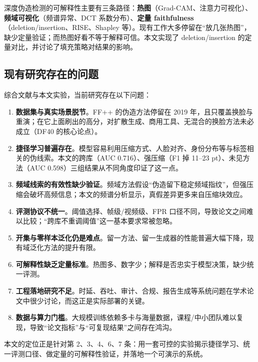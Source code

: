 深度伪造检测的可解释性主要有三条路径：\textbf{热图}（Grad-CAM\cite{selvaraju2017gradcam}、注意力可视化）、\textbf{频域可视化}（频谱异常、DCT 系数分布）、\textbf{定量 faithfulness}（deletion/insertion、RISE、Shapley 等）。现有工作大多停留在“放几张热图”，缺少定量验证；而热图好看不等于解释可信。本文实现了 deletion/insertion 的定量对比，并讨论了填充策略对结果的影响。

\subsection{现有研究存在的问题}
\label{sec:problems}

综合文献与本文实验，当前研究存在以下问题：

\begin{enumerate}
  \item \textbf{数据集与真实场景脱节}。FF++ 的伪造方法停留在 2019 年，且只覆盖换脸与重演；在它上面刷出的高分，对扩散生成、商用工具、无混合的换脸方法未必成立（DF40 的核心论点）。
  \item \textbf{捷径学习普遍存在}。模型容易利用压缩方式、人脸对齐、身份分布等与标签相关的伪线索。本文的跨库（AUC 0.716）、强压缩（F1 掉 11--23 pt）、未见方法（AUC 0.598）三组结果从不同角度印证了这一点。
  \item \textbf{频域线索的有效性缺少验证}。频域方法假设“伪造留下稳定频域指纹”，但强压缩会破坏高频信息；本文的频谱分析显示，真假差异更多来自压缩块效应。
  \item \textbf{评测协议不统一}。阈值选择、帧级/视频级、FPR 口径不同，导致论文之间难以比较；“跨库不重调阈值”这一基本要求常被忽略。
  \item \textbf{开集与零样本泛化仍是难点}。留一方法、留一生成器的性能普遍大幅下降，现有域泛化方法的提升有限。
  \item \textbf{可解释性缺乏定量标准}。热图多、数字少；解释是否忠实于模型决策，缺少统一评测。
  \item \textbf{工程落地研究不足}。时延、吞吐、审计、合规、报告生成等系统问题在学术论文中很少讨论，而这正是实际部署的关键。
  \item \textbf{数据与算力门槛}。大规模训练依赖多卡与海量数据，课程/中小团队难以复现，导致“论文指标”与“可复现结果”之间存在鸿沟。
\end{enumerate}

本文的定位正是针对第 2、3、4、6、7 条：用一套可控的实验揭示捷径学习、统一评测口径、做定量的可解释性验证，并落地一个可演示的系统。

